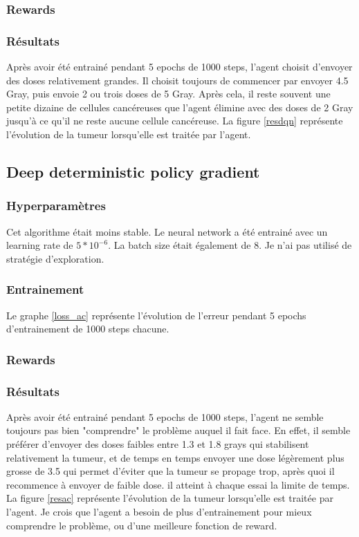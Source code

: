 \documentclass[12pt]{article}
\begin{document}
\subsubsection{Rewards}
\subsubsection{Résultats}
Après avoir été entrainé pendant 5 epochs de 1000 steps, l'agent choisit d'envoyer des doses relativement grandes. Il choisit toujours de commencer par envoyer 4.5 Gray, puis envoie 2 ou trois doses de 5 Gray. Après cela, il reste souvent une petite dizaine de cellules cancéreuses que l'agent élimine avec des doses de 2 Gray jusqu'à ce qu'il ne reste aucune cellule cancéreuse. La figure \ref{resdqn} représente l'évolution de la tumeur lorsqu'elle est traitée par l'agent.

\subsection{Deep deterministic policy gradient}
\subsubsection{Hyperparamètres}
Cet algorithme était moins stable. Le neural network a été entrainé avec un learning rate de $5 * 10^{-6}$. La batch size était également de 8. Je n'ai pas utilisé de stratégie d'exploration.
\subsubsection{Entrainement}
Le graphe \ref{loss_ac} représente l'évolution de l'erreur pendant 5 epochs d'entrainement de 1000 steps chacune.\\
\subsubsection{Rewards}
\subsubsection{Résultats}
Après avoir été entrainé pendant 5 epochs de 1000 steps, l'agent ne semble toujours pas bien "comprendre" le problème auquel il fait face. En effet, il semble préférer d'envoyer des doses faibles entre 1.3 et 1.8 grays qui stabilisent relativement la tumeur, et de temps en temps envoyer une dose légèrement plus grosse de 3.5 qui permet d'éviter que la tumeur se propage trop, après quoi il recommence à envoyer de faible dose. il atteint à chaque essai la limite de temps. La figure \ref{resac} représente l'évolution de la tumeur lorsqu'elle est traitée par l'agent. Je crois que l'agent a besoin de plus d'entrainement pour mieux comprendre le problème, ou d'une meilleure fonction de reward.
\end{document}
